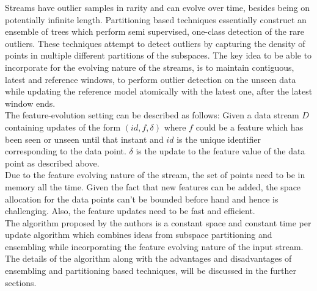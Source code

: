 \documentclass{article}
\begin{document}
    Streams have outlier samples in rarity and can evolve over time, besides being on potentially infinite length. Partitioning based techniques\cite{tan2011fast} essentially construct an ensemble of trees which perform semi supervised, one-class detection of the rare outliers. These techniques attempt to detect outliers by capturing the density of points in multiple different partitions of the subspaces. The key idea to be able to incorporate for the evolving nature of the streams, is to maintain contiguous, latest and reference windows, to perform outlier detection on the unseen data while updating the reference model atomically with the latest one, after the latest window ends. \\

    The feature-evolution setting can be described as follows: Given a data stream $D$ containing updates of the form $(id, f, \delta)$ where $f$ could be a feature which has been seen or unseen until that instant and $id$ is the unique identifier corresponding to the data point. $\delta$ is the update to the feature value of the data point as described above. \\

    Due to the feature evolving nature of the stream, the set of points need to be in memory all the time. Given the fact that new features can be added, the space allocation for the data points can't be bounded before hand and hence is challenging. Also, the feature updates need to be fast and efficient. \\

    The algorithm proposed by the authors is a constant space and constant time per update algorithm which combines ideas from subspace partitioning and ensembling while incorporating the feature evolving nature of the input stream. The details of the algorithm along with the advantages and disadvantages of ensembling and partitioning based techniques, will be discussed in the further sections.



\end{document}
